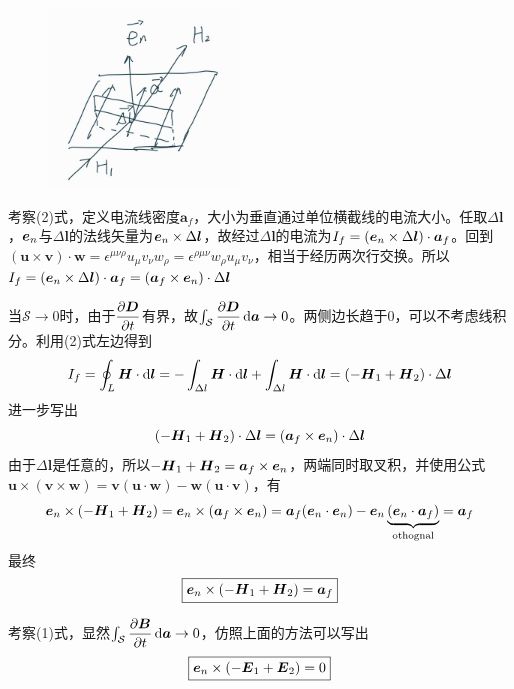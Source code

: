 \documentclass{mynote}
\begin{document}
\begin{figure}[H]
    \centering
    \includegraphics[width=2in]{./Imgs/QQ_Image_1664287190967.jpg}
\end{figure}

\begin{proposition}
    考察(2)式，定义电流线密度$\bm{a}_f$，大小为垂直通过单位横截线的电流大小。任取$\Delta \bm{l}$，$\boldsymbol{e}_n$与$\Delta \bm{l}$的法线矢量为$\boldsymbol{e}_n \times \Delta \boldsymbol{l}$，故经过$\Delta \bm{l}$的电流为$I_f = (\boldsymbol{e}_n \times \Delta \boldsymbol{l}) \cdot \boldsymbol{a}_f$。回到$(\bm{u} \times \bm{v}) \cdot \bm{w} = \epsilon^{\mu \nu \rho} u_{\mu} v_{\nu} w_{\rho} = \epsilon^{\rho \mu \nu} w_{\rho} u_{\mu} v_{\nu} $，相当于经历两次行交换。所以$I_f = (\boldsymbol{e}_n \times \Delta \boldsymbol{l}) \cdot \boldsymbol{a}_f = (\boldsymbol{a}_f \times \boldsymbol{e}_n) \cdot \Delta \boldsymbol{l}$

    当$\mathcal{S} \to 0$时，由于$\dfrac{\partial \boldsymbol{D}}{\partial t}$有界，故$\int_{\mathcal{S}} \dfrac{\partial \boldsymbol{D}}{\partial t} \mathop{}\!\mathrm{d} \boldsymbol{a} \to 0 $。两侧边长趋于0，可以不考虑线积分。利用(2)式左边得到
    \[
        I_f = \oint_L \boldsymbol{H} \cdot \mathop{}\!\mathrm{d} \boldsymbol{l} = -\int_{\Delta l} \boldsymbol{H} \cdot \mathop{}\!\mathrm{d} \boldsymbol{l} + \int_{\Delta l} \boldsymbol{H} \cdot \mathop{}\!\mathrm{d} \boldsymbol{l} = (-\boldsymbol{H}_1 + \boldsymbol{H}_2) \cdot \Delta \boldsymbol{l}
    \]
    进一步写出
    \[
        (-\boldsymbol{H}_1 + \boldsymbol{H}_2) \cdot \Delta \boldsymbol{l} = (\boldsymbol{a}_f \times \boldsymbol{e}_n) \cdot \Delta \boldsymbol{l}
    \]
    由于$\Delta \bm{l}$是任意的，所以$-\boldsymbol{H}_1 + \boldsymbol{H}_2 = \boldsymbol{a}_f \times \boldsymbol{e}_n$，两端同时取叉积，并使用公式$\bm{u} \times (\bm{v} \times \bm{w}) = \bm{v} (\bm{u} \cdot \bm{w}) - \bm{w}(\bm{u} \cdot \bm{v}) $，有
    \[
        \boldsymbol{e}_n \times (-\boldsymbol{H}_1 + \boldsymbol{H}_2) = \boldsymbol{e}_n \times (\boldsymbol{a}_f \times \boldsymbol{e}_n) = \boldsymbol{a}_f(\boldsymbol{e}_n \cdot \boldsymbol{e}_n) - \boldsymbol{e}_n \underbrace{(\boldsymbol{e}_n \cdot \boldsymbol{a}_f)}_{\textrm{othognal}} = \boldsymbol{a}_f
    \]
    最终
    \[
    \boxed{ \boldsymbol{e}_n \times (-\boldsymbol{H}_1 + \boldsymbol{H}_2) = \boldsymbol{a}_f}    
    \]
\end{proposition}






\begin{proposition}
    考察(1)式，显然$\int_{\mathcal{S}} \dfrac{\partial \boldsymbol{B}}{\partial t} \mathop{}\!\mathrm{d} \boldsymbol{a} \to 0$，仿照上面的方法可以写出
    \[
    \boxed{\boldsymbol{e}_n \times (-\boldsymbol{E}_1 + \boldsymbol{E}_2) = 0}    
    \]
\end{proposition}
\end{document}
